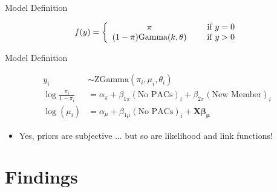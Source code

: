 \documentclass[12pt, aspectratio=169]{beamer}
\begin{document}
\begin{frame}{Model Definition}

\begin{align}
f(y) = \left\{ \begin{array}{cc} 
                \pi & \hspace{5mm} \text{if $y = 0$} \\
                (1 - \pi) \text{Gamma}(k, \theta) & \hspace{5mm}  \text{if $y > 0$} \\
                \end{array} \right.
\end{align}

\end{frame}


\begin{frame}{Model Definition}

\begin{align}
    y_i &\sim \text{ZGamma}(\pi_i, \mu_i, \theta_i) \\
    \log \frac{\pi_i}{1 - \pi_i} &= \alpha_{\pi} + \beta_{1\pi} (\text{No PACs})_i + \beta_{2\pi} (\text{New Member})_i \\
   \log( \mu_i) &= \alpha_{\mu} + \beta_{1\mu} (\text{No PACs})_i + \bm{X} \bm{\beta_{\mu}}
\end{align} \pause

\begin{itemize}
	\item Yes, priors are subjective ... but so are likelihood and link functions!
\end{itemize}

\end{frame}


\section{Findings} \label{sec: findings}
\end{document}
